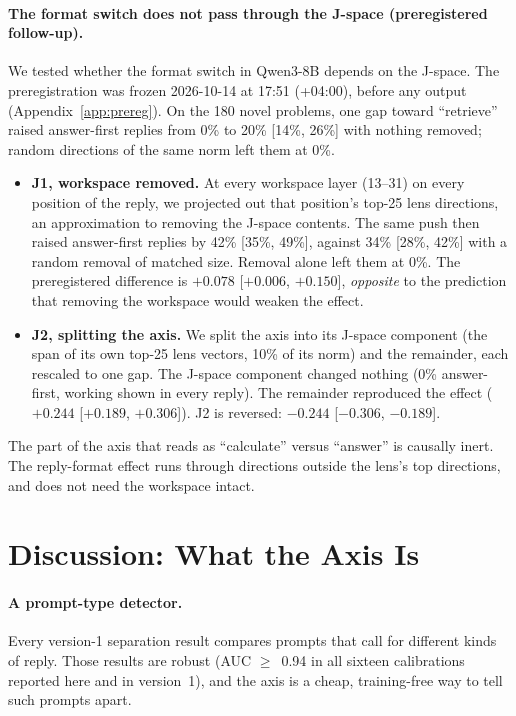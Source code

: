 \documentclass[11pt]{article}
\begin{document}
\paragraph{The format switch does not pass through the J-space (preregistered follow-up).} We tested whether the format switch in Qwen3-8B depends on the J-space. The preregistration was frozen 2026-10-14 at 17:51 (+04:00), before any output (Appendix~\ref{app:prereg}). On the 180 novel problems, one gap toward ``retrieve'' raised answer-first replies from 0\% to 20\% [14\%, 26\%] with nothing removed; random directions of the same norm left them at 0\%.
\begin{itemize}
  \item \textbf{J1, workspace removed.} At every workspace layer (13--31) on every position of the reply, we projected out that position's top-25 lens directions, an approximation to removing the J-space contents. The same push then raised answer-first replies by 42\% [35\%, 49\%], against 34\% [28\%, 42\%] with a random removal of matched size. Removal alone left them at 0\%. The preregistered difference is $+0.078$ [$+0.006$, $+0.150$], \emph{opposite} to the prediction that removing the workspace would weaken the effect.
  \item \textbf{J2, splitting the axis.} We split the axis into its J-space component (the span of its own top-25 lens vectors, 10\% of its norm) and the remainder, each rescaled to one gap. The J-space component changed nothing (0\% answer-first, working shown in every reply). The remainder reproduced the effect ($+0.244$ [$+0.189$, $+0.306$]). J2 is reversed: $-0.244$ [$-0.306$, $-0.189$].
\end{itemize}
The part of the axis that reads as ``calculate'' versus ``answer'' is causally inert. The reply-format effect runs through directions outside the lens's top directions, and does not need the workspace intact.

\section{Discussion: What the Axis Is}

\paragraph{A prompt-type detector.} Every version-1 separation result compares prompts that call for different kinds of reply. Those results are robust (AUC $\geq$~0.94 in all sixteen calibrations reported here and in version~1), and the axis is a cheap, training-free way to tell such prompts apart.
\end{document}
